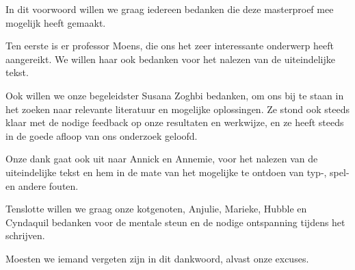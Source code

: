\documentclass[master=cws,masteroption=ai]{kulemt}
\begin{document}
\begin{preface}
In dit voorwoord willen we graag iedereen bedanken die deze masterproef mee mogelijk heeft gemaakt.

Ten eerste is er professor Moens, die ons het zeer interessante onderwerp heeft aangereikt. We willen haar ook bedanken voor het nalezen van de uiteindelijke tekst.

Ook willen we onze begeleidster Susana Zoghbi bedanken, om ons bij te staan in het zoeken naar relevante literatuur en mogelijke oplossingen. Ze stond ook steeds klaar met de nodige feedback op onze resultaten en werkwijze, en ze heeft steeds in de goede afloop van ons onderzoek geloofd.

Onze dank gaat ook uit naar Annick en Annemie, voor het nalezen van de uiteindelijke tekst en hem in de mate van het mogelijke te ontdoen van typ-, spel- en andere fouten. 

Tenslotte willen we graag onze kotgenoten, Anjulie, Marieke, Hubble en Cyndaquil bedanken voor de mentale steun en de nodige ontspanning tijdens het schrijven.

Moesten we iemand vergeten zijn in dit dankwoord, alvast onze excuses.

\end{preface}

\tableofcontents*
\end{document}
